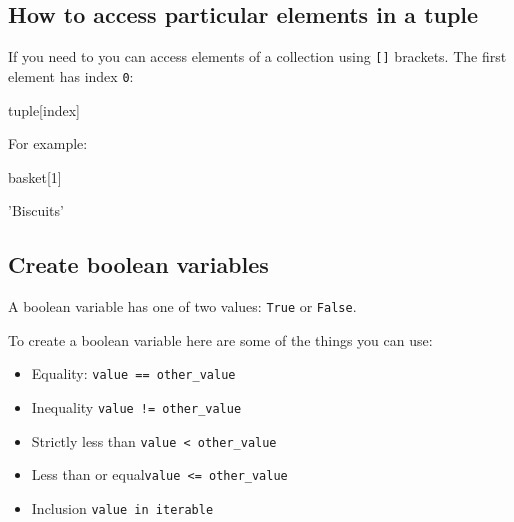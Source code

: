 \subsection{How to access particular elements in a tuple}
\label{sec:how-to-access-particular-elements-in-a-tuple}

If you need to you can access elements of a collection using \texttt{[]} brackets. The
first element has index \texttt{0}:

\begin{api}
tuple[index]
\end{api}


For example:




\begin{pyin}
basket[1]
\end{pyin}





\begin{raw}
'Biscuits'
\end{raw}





\subsection{Create boolean variables}
\label{sec:create_boolean_variables}

A boolean variable has one of two values: \texttt{True} or \texttt{False}.


To create a boolean variable here are some of the things you can use:
\begin{itemize}
\item 

Equality: \texttt{value == other\_value}

\item 

Inequality \texttt{value != other\_value}

\item 

Strictly less than \texttt{value < other\_value}

\item 

Less than or equal\texttt{value <= other\_value}

\item 

Inclusion \texttt{value in iterable}

\end{itemize}


